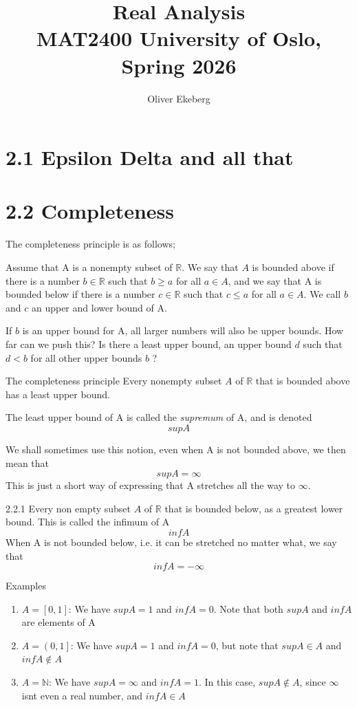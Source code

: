 \documentclass[a4paper,norsk]{article}
\title{Real Analysis \\ MAT2400 University of Oslo, Spring 2026}
\author{Oliver Ekeberg}
\renewcommand{\geq}{\geqslant}
\renewcommand{\leq}{\leqslant}
\begin{document}
\tableofcontents


\section*{2.1 Epsilon Delta and all that }



\section*{2.2 Completeness }


The completeness principle is as follows;

Assume that A is a nonempty subset of $ \mathbb{R} $. We say that $ A $ is bounded above if there is a number $ b \in \mathbb{R} $ such that $ b \geq a $  for all $ a \in A $, and we say that A is bounded below if there is a number $ c \in \mathbb{R} $ such that $ c \leq a $ for all $ a \in A $. We call $ b $ and $ c $ an upper and lower bound of A.

If $ b $ is an upper bound for A, all larger numbers will also be upper bounds. How far can we push this? Is there a least upper bound, an upper bound $ d $ such that $ d < b $ for all other upper bounds $ b $ ?

\begin{definitionbox}{The completeness principle}{}
Every nonempty subset $ A $ of $ \mathbb{R} $ that is bounded above has a least upper bound. 

The least upper bound of A is called the \textit{supremum} of A, and is denoted
\[
    sup A
\]

We shall sometimes use this notion, even when A is not bounded above, we then mean that 
\[
    sup A = \infty
\]
This is just a short way of expressing that A stretches all the way to $ \infty $. 
\end{definitionbox}

\begin{propositionbox}{2.2.1}{}
Every non empty subset $ A $ of $ \mathbb{R} $ that is bounded below, as a greatest lower bound. This is called the infimum of A
\[
    inf A
\]
When A is not bounded below, i.e. it can be stretched no matter what, we say that 
\[
    inf A = - \infty
\]
\end{propositionbox}

Examples

\begin{enumerate}
  \item $ A = \left[ 0, 1 \right]  $: We have $ sup A  = 1$ and $ inf A  = 0$. Note that both $ sup A $ and $ inf A $  are elements of A
  \item $ A = \left( 0, 1 \right] $: We have $ sup A = 1 $ and $ inf A = 0 $, but note that $ sup A \in A $ and $ inf A \notin A $ 
  \item $ A = \mathbb{N} $: We have $ sup A = \infty $ and $ inf A = 1 $. In this case, $ sup A \notin A $, since $ \infty $ isnt even a real number,  and $ inf A \in  A $ 
\end{enumerate}
\end{document}
